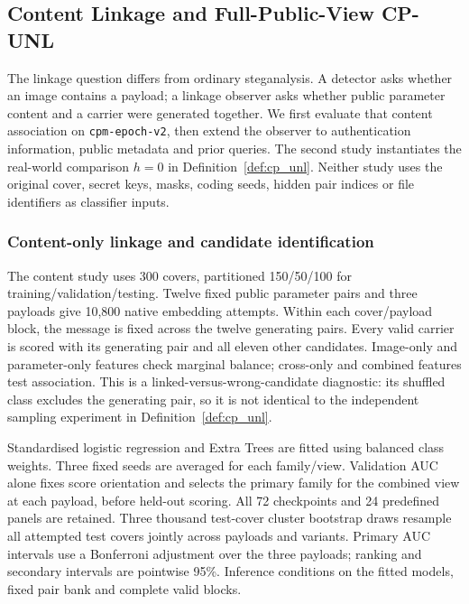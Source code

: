\documentclass[pdflatex,sn-mathphys-num]{sn-jnl}%
\theoremstyle{definition}
\theoremstyle{game}
\theoremstyle{thmstyleone}%
\theoremstyle{thmstyletwo}%
\theoremstyle{thmstylethree}%
\begin{document}
\subsection{Content Linkage and Full-Public-View CP-UNL}
\label{sec:empirical_linkability}

The linkage question differs from ordinary steganalysis. A detector asks
whether an image contains a payload; a linkage observer asks whether
public parameter content and a carrier were generated together. We first
evaluate that content association on \texttt{cpm-epoch-v2}, then
extend the observer to authentication information, public metadata and
prior queries. The second study instantiates the real-world comparison
$h=0$ in Definition~\ref{def:cp_unl}. Neither study uses the original
cover, secret keys, masks, coding seeds, hidden pair indices or file
identifiers as classifier inputs.

\subsubsection{Content-only linkage and candidate identification}
\label{subsec:revised-content-linkage}
The content study uses 300 covers, partitioned 150/50/100 for
training/validation/testing. Twelve fixed public parameter pairs and
three payloads give 10,800 native embedding attempts. Within each
cover/payload block, the message is fixed across the twelve generating
pairs. Every valid carrier is scored with its generating pair and all
eleven other candidates. Image-only and parameter-only features check
marginal balance; cross-only and combined features test association.
This is a linked-versus-wrong-candidate diagnostic: its shuffled class
excludes the generating pair, so it is not identical to the independent
sampling experiment in Definition~\ref{def:cp_unl}.

Standardised logistic regression and Extra Trees
\cite{hastie2009elements,geurts2006extremely} are fitted using balanced
class weights. Three fixed seeds are averaged for each family/view.
Validation AUC alone fixes score orientation and selects the primary
family for the combined view at each payload, before held-out scoring.
All 72 checkpoints and 24 predefined panels are retained. Three thousand
test-cover cluster bootstrap draws resample all attempted test covers
jointly across payloads and variants. Primary AUC intervals use a
Bonferroni adjustment over the three payloads; ranking and secondary
intervals are pointwise 95\%. Inference conditions on the fitted models,
fixed pair bank and complete valid blocks.
\end{document}
